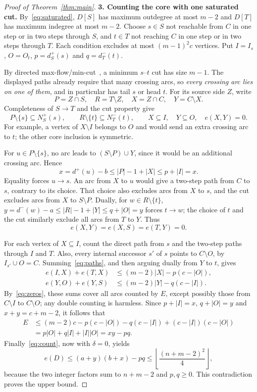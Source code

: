 \documentclass[11pt,a4paper]{amsart}
\newcommand{\fl}[1]{\left\lfloor#1\right\rfloor}
\newcommand{\ar}{\to}
\begin{document}
\begin{proof}[Proof of Theorem~\ref{thm:main}]
\par{}
\smallskip\noindent
\textbf{3. Counting the core with one saturated cut.}
By~\eqref{eq:saturated}, $D[S]$ has maximum outdegree at most $m-2$
and $D[T]$ has maximum indegree at most $m-2$.
Choose $s\in S$ not reachable from $C$ in one step or in two steps
through $S$, and $t\in T$ not reaching $C$ in one step or in two steps
through $T$. Each condition excludes at most $(m-1)^2c$ vertices.
Put $I=I_s$, $O=O_t$, $p=d_S^+(s)$ and $q=d_T^-(t)$.

By directed max-flow/min-cut~\cite{flow}, a minimum $s$--$t$ cut has
size $m-1$. The displayed paths already require that many crossing arcs,
so \emph{every crossing arc lies on one of them}, and in particular
has tail $s$ or head $t$. For its source side $Z$,
write
\[
 P=Z\cap S,\quad R=T\setminus Z,\quad
 X=Z\cap C,\quad Y=C\setminus X.
\]
Completeness of $S\ar T$ and the cut property give
\[
 P\setminus\{s\}\subseteq N_S^+(s),\qquad
 R\setminus\{t\}\subseteq N_T^-(t),\qquad
 X\subseteq I,\quad Y\subseteq O,\quad e(X,Y)=0.
\]
For example, a vertex of $X\setminus I$ belongs to $O$ and would send
an extra crossing arc to $t$; the other core inclusion is symmetric.

For $u\in P\setminus\{s\}$, no arc leads to $(S\setminus P)\cup Y$,
since it would be an additional crossing arc. Hence
\[
 x=d^+(u)-b\le |P|-1+|X|\le p+|I|=x.
\]
Equality forces $u\ar s$. An arc from $X$ to $u$ would give a
two-step path from $C$ to $s$, contrary to its choice. That choice also
excludes arcs from $X$ to $s$, and the cut excludes arcs from $X$ to
$S\setminus P$. Dually, for $w\in R\setminus\{t\}$,
$y=d^-(w)-a\le|R|-1+|Y|\le q+|O|=y$ forces $t\ar w$;
the choice of $t$ and the cut similarly exclude all arcs from $T$ to $Y$.
Thus
\begin{equation}\label{eq:zeros}
 e(X,Y)=e(X,S)=e(T,Y)=0.
\end{equation}

For each vertex of $X\subseteq I$, count the direct path from $s$ and
the two-step paths through $I$ and $T$. Also, every internal successor
$s'$ of $s$ points to $C\setminus O$, by $I_{s'}\cup O=C$.
Summing~\eqref{eq:paths}, and then arguing dually from $Y$ to $t$, gives
\[
 \begin{aligned}
 e(I,X)+e(T,X)&\le(m-2)|X|-p(c-|O|),\\
 e(Y,O)+e(Y,S)&\le(m-2)|Y|-q(c-|I|).
 \end{aligned}
\]
By~\eqref{eq:zeros}, these sums cover all arcs counted by $E$, except
possibly those from $C\setminus I$ to $C\setminus O$; any
double counting is harmless. Since $p+|I|=x$, $q+|O|=y$ and $x+y=c+m-2$, it follows that
\[
 \begin{aligned}
 E&\le(m-2)c-p(c-|O|)-q(c-|I|)+(c-|I|)(c-|O|)\\
  &=p|O|+q|I|+|I||O|=xy-pq.
 \end{aligned}
\]
Finally~\eqref{eq:count}, now with $\delta=0$, yields
\[
 e(D)\le(a+y)(b+x)-pq\le\fl{\frac{(n+m-2)^2}{4}},
\]
because the two integer factors sum to $n+m-2$ and $p,q\ge0$.
This contradiction proves the upper bound.
\end{proof}
\end{document}
